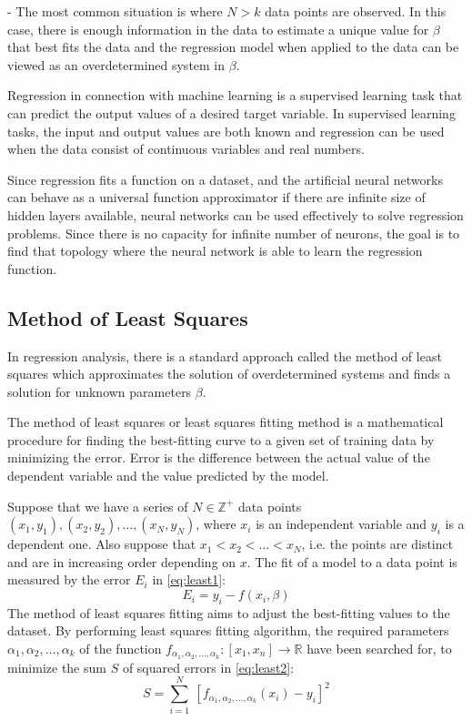 \noindent- The most common situation is where $N>k$ data points are observed. In this case, there is enough information in the data to estimate a unique value for $\beta$ that best fits the data and the regression model when applied to the data can be viewed as an overdetermined system in $\beta$.\bigskip

Regression in connection with machine learning \cite{allen2007understanding} is a supervised learning task that can predict the output values of a desired target variable. In supervised learning tasks, the input and output values are both known and regression can be used when the data consist of continuous variables and real numbers.\smallskip

Since regression fits a function on a dataset, and the artificial neural networks can behave as a universal function approximator if there are infinite size of hidden layers available, neural networks can be used effectively to solve regression problems. Since there is no capacity for infinite number of neurons, the goal is to find that topology where the neural network is able to learn the regression function.


\subsection{Method of Least Squares}

In regression analysis, there is a standard approach called the method of least squares which approximates the solution of overdetermined systems and finds a solution for unknown parameters $\beta$.\medskip

The method of least squares or least squares fitting method \cite{wolberg2006data} is a mathematical procedure for finding the best-fitting curve to a given set of training data by minimizing the error. Error is the difference between the actual value of the dependent variable and the value predicted by the model. \medskip

Suppose that we have a series of $N\in\mathbb{Z}^+$ data points $(x_1, y_1), (x_2, y_2), \ldots, (x_N, y_N)$, where $x_i$ is an independent variable and $y_i$ is a dependent one. Also suppose that $x_1 < x_2 < \ldots < x_N$, i.e. the points are distinct and are in increasing order depending on $x$. The fit of a model to a data point is measured by the error $E_i$ in \autoref{eq:least1}:
\begin{equation} E_i=y_i-f(x_i,\beta) \label{eq:least1} \end{equation}
The method of least squares fitting aims to adjust the best-fitting values to the dataset. By performing least squares fitting algorithm, the required parameters $\alpha_1, \alpha_2, \ldots, \alpha_k$ of the function $f_{\alpha_1, \alpha_2, \ldots, \alpha_k} : [x_1, x_n] \rightarrow \mathbb{R}$ have been searched for, to minimize the sum $S$ of squared errors in \autoref{eq:least2}:
\begin{equation} S=\sum_{i = 1}^N ~ [f_{\alpha_1, \alpha_2, \ldots, \alpha_k}(x_i) - y_i]^2 \label{eq:least2} \end{equation}


